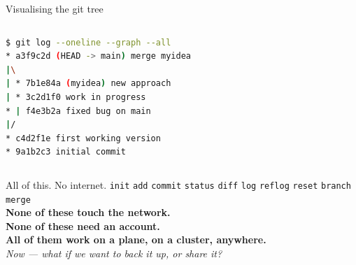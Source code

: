 \documentclass[aspectratio=169]{beamer}
\begin{document}
\begin{frame}[fragile]{Visualising the git tree}
    \begin{columns}
            \vspace{0.4em}
            \begin{lstlisting}[language=bash]
$ git log --oneline --graph --all
* a3f9c2d (HEAD -> main) merge myidea
|\
| * 7b1e84a (myidea) new approach
| * 3c2d1f0 work in progress
* | f4e3b2a fixed bug on main
|/
* c4d2f1e first working version
* 9a1b2c3 initial commit
            \end{lstlisting}
    \end{columns}
\end{frame}


\begin{frame}{All of this. No internet.}
    \centering
    \vspace{0.8em}
    \large
    \texttt{init} \quad \texttt{add} \quad \texttt{commit} \quad \texttt{status} \quad \texttt{diff} \quad \texttt{log} \quad \texttt{reflog} \quad \texttt{reset} \quad \texttt{branch} \quad \texttt{merge}\\[1.2em]
    \normalsize
    \pause
    \textbf{None of these touch the network.}\\[0.4em]
    \textbf{None of these need an account.}\\[0.4em]
    \textbf{All of them work on a plane, on a cluster, anywhere.}\\[1.2em]
    \pause
    \textit{Now --- what if we want to back it up, or share it?}
\end{frame}
\end{document}
